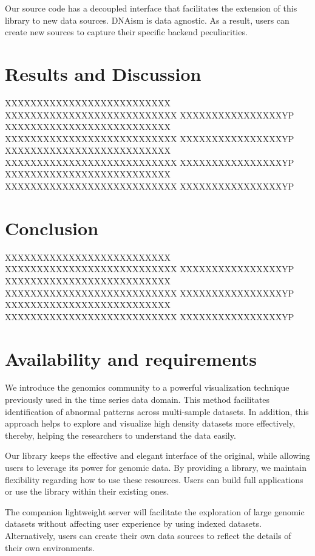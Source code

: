 \documentclass{bmcart}
\begin{document}
Our source code has a decoupled interface that facilitates the extension of
this library to new data sources. DNAism is data agnostic. As a result, users
can create new sources to capture their specific backend peculiarities.


\section*{Results and Discussion}

XXXXXXXXXXXXXXXXXXXXXXXXXX XXXXXXXXXXXXXXXXXXXXXXXXXXX XXXXXXXXXXXXXXXXYP
XXXXXXXXXXXXXXXXXXXXXXXXXX XXXXXXXXXXXXXXXXXXXXXXXXXXX XXXXXXXXXXXXXXXXYP
XXXXXXXXXXXXXXXXXXXXXXXXXX XXXXXXXXXXXXXXXXXXXXXXXXXXX XXXXXXXXXXXXXXXXYP
XXXXXXXXXXXXXXXXXXXXXXXXXX XXXXXXXXXXXXXXXXXXXXXXXXXXX XXXXXXXXXXXXXXXXYP


\section*{Conclusion}
XXXXXXXXXXXXXXXXXXXXXXXXXX XXXXXXXXXXXXXXXXXXXXXXXXXXX XXXXXXXXXXXXXXXXYP
XXXXXXXXXXXXXXXXXXXXXXXXXX XXXXXXXXXXXXXXXXXXXXXXXXXXX XXXXXXXXXXXXXXXXYP
XXXXXXXXXXXXXXXXXXXXXXXXXX XXXXXXXXXXXXXXXXXXXXXXXXXXX XXXXXXXXXXXXXXXXYP

\section*{Availability and requirements}
We introduce the genomics community to a powerful visualization technique
previously used in the time series data domain. This method facilitates
identification of abnormal patterns across multi-sample datasets.  In addition, this
approach helps to explore and visualize high density datasets more effectively,
thereby, helping the researchers to understand the data easily.

Our library keeps the effective and elegant interface of the original,
while allowing users to leverage its power for genomic data. By providing a
library, we maintain flexibility regarding how to use these resources. Users
can build full applications or use the library within their existing ones.

The companion lightweight server will facilitate the exploration of large
genomic datasets without affecting user experience by using indexed datasets.
Alternatively, users can create their own data sources to reflect the details
of their own environments.
\end{document}
